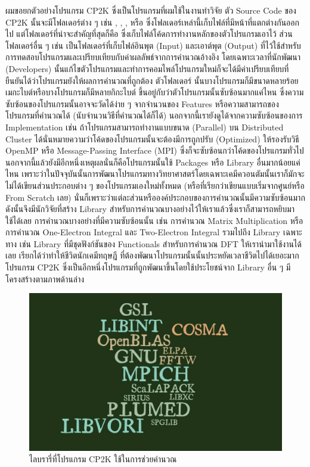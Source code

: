 ผมขอยกตัวอย่างโปรแกรม CP2K ซึ่งเป็นโปรแกรมที่ผมใช้ในงานทำวิจัย ตัว Source Code ของ CP2K นั้นจะมีโฟลเดอร์ต่าง ๆ เช่น ,
, , หรือ  ซึ่งโฟลเดอร์เหล่านี้เก็บไฟล์ที่มีหน้าที่แตกต่างกันออกไป แต่โฟลเดอร์ที่น่าจะสำคัญที่สุดก็คือ
 ซึ่งเก็บไฟล์โค้ดการทำงานหลักของตัวโปรแกรมเอาไว้ ส่วนโฟลเดอร์อื่น ๆ เช่น  เป็นโฟลเดอร์ที่เก็บไฟล์อินพุต (Input)
และเอาต์พุต (Output) ที่ไว้ใช้สำหรับการทดสอบโปรแกรมและเปรียบเทียบกับค่าผลลัพธ์จากการคำนวณอ้างอิง โดยเฉพาะเวลาที่นักพัฒนา
(Developers) นั้นแก้ไขตัวโปรแกรมและทำการคอมไพล์โปรแกรมใหม่ก็จะได้มีค่าเปรียบเทียบที่ยืนยันได้ว่าโปรแกรมยังให้ผลการคำนวณที่ถูกต้อง
ตัวโฟลเดอร์  นั้นบางโปรแกรมก็มีขนาดหลายร้อยเมกะไบต์หรือบางโปรแกรมก็มีหลายกิกะไบต์ ขึ้นอยู่กับว่าตัวโปรแกรมนั้นซับซ้อนมากแค่ไหน
ซึ่งความซับซ้อนของโปรแกรมนั้นอาจจะวัดได้ง่าย ๆ จากจำนวนของ Features หรือความสามารถของโปรแกรมที่คำนวณได้ (นับจำนวนวิธีที่คำนวณได้ก็ได้)
นอกจากนี้เรายังดูได้จากความซับซ้อนของการ Implementation เช่น ถ้าโปรแกรมสามารถทำงานแบบขนาด (Parallel) บน Distributed
Cluster ได้นั่นหมายความว่าโค้ดของโปรแกรมนั้นจะต้องมีการถูกปรับ (Optimized) ให้รองรับวิธี OpenMP หรือ Message-Passing Interface
(MPI) ซึ่งก็จะซับซ้อนกว่าโค้ดของโปรแกรมทั่วไป นอกจากนี้แล้วยังมีอีกหนึ่งเหตุผลนั่นก็คือโปรแกรมนั้นใช้ Packages หรือ Library อื่นมากน้อยแค่ไหน
เพราะว่าในปัจจุบันนั้นการพัฒนาโปรแกรมทางวิทยาศาสตร์โดยเฉพาะเคมีควอนตัมนั้นเราก็มักจะไม่ได้เขียนส่วนประกอบต่าง ๆ ของโปรแกรมเองใหม่ทั้งหมด
(หรือที่เรียกว่าเขียนแบบเริ่มจากศูนย์หรือ From Scratch เลย) นั่นก็เพราะว่าแต่ละส่วนหรือองค์ประกอบของการคำนวณนั้นมีความซับซ้อนมาก
ดังนั้นจึงมีนักวิจัยที่สร้าง Library สำหรับการคำนวณบางอย่างไว้ให้เราแล้วซึ่งเราก็สามารถหยิบมาใช้ได้เลย การคำนวณบางอย่างที่มีความซับซ้อนนั้น
เช่น การคำนวณ Matrix Multiplication หรือการคำนวณ One-Electron Integral และ Two-Electron Integral รวมไปถึง Library
เฉพาะทาง เช่น Library ที่มีชุดฟังก์ชันของ Functionals สำหรับการคำนวณ DFT ให้เรานำมาใช้งานได้เลย เรียกได้ว่าทำให้ชีวิตนักเคมีทฤษฎี%
ที่ต้องพัฒนาโปรแกรมนั้นนั้นประหยัดเวลาชีวิตไปได้เยอะมาก โปรแกรม CP2K ซึ่งเป็นอีกหนึ่งโปรแกรมที่ถูกพัฒนาขึ้นโดยใช้ประโยชน์จาก Library
อื่น ๆ มีโครงสร้างตามภาพด้านล่าง

\begin{figure}[htbp]
  \centering
  \includegraphics[width=0.7\linewidth]{fig/cp2k-lib.jpg}
  \caption{ไลบรารี่ที่โปรแกรม CP2K ใช้ในการช่วยคำนวณ}
  \label{fig:cp2k_lib}
\end{figure}

